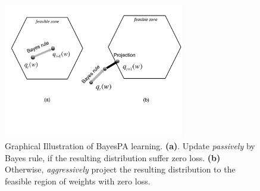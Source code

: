 \documentclass[twoside,11pt]{article}
\begin{document}
\begin{figure}[t]
\begin{center}
\includegraphics[width=0.7\textwidth]{pa.pdf}
\end{center}\vspace{-.3cm}
\caption{Graphical Illustration of BayesPA learning. \textbf{(a)}. Update \emph{passively} by Bayes rule, if the resulting distribution suffer zero loss. \textbf{(b)} Otherwise, \emph{aggressively} project the resulting distribution to the feasible region of weights with zero loss. }\label{fig:bayesPA}\vspace{-.3cm}
\end{figure}
\end{document}
